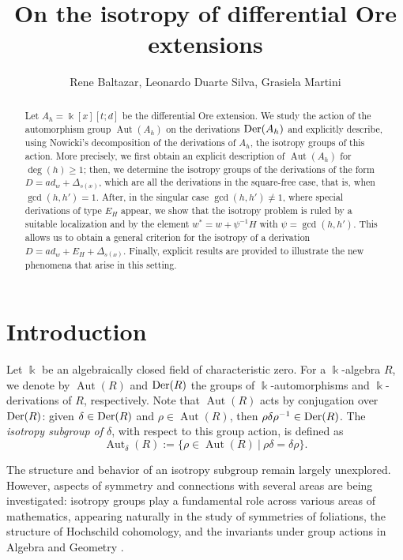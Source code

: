 \documentclass{article}
\title{On the isotropy of differential Ore extensions}
\author{Rene Baltazar, Leonardo Duarte Silva, Grasiela Martini}
\date{}
\numberwithin{equation}{section}\theoremstyle{plain}
\newcommand{\der}{{\rm Der}}
\DeclareMathOperator{\Aut}{Aut}
\begin{document}
\maketitle

\begin{abstract}
Let $A_h=\Bbbk[x][t;d]$ be the differential Ore extension. We study the action of the automorphism group $\Aut(A_h)$ on the derivations $\der(A_h)$ and explicitly describe, using Nowicki’s decomposition of the derivations of $A_h$, the isotropy groups of this action.
More precisely, we first obtain an explicit description of $\Aut(A_h)$ for $\deg(h)\geq 1$;
then, we determine the isotropy groups of the derivations of the form $D=ad_w+\Delta_{s(x)}$, which are all the derivations in the square-free case, that is, when $\gcd(h,h')=1$.
After, in the singular case $\gcd(h,h')\neq 1$, where special derivations of type $E_H$ appear, we show that the isotropy problem is ruled by a suitable localization and by the element $w^\ast=w+\psi^{-1}H$ with $\psi=\gcd(h,h')$.
This allows us to obtain a general criterion for the isotropy of a derivation $D=ad_w+E_H+\Delta_{s(x)}$.
Finally, explicit results are provided to illustrate the new phenomena that arise in this setting.

\end{abstract}


\maketitle


\section{Introduction}

Let $\Bbbk$ be an algebraically closed field of characteristic zero.
For a $\Bbbk$-algebra $R$, we denote by $\Aut(R)$ and $\der(R)$ the groups of $\Bbbk$-automorphisms and $\Bbbk$-derivations of $R$, respectively.
Note that $\Aut(R)$ acts by conjugation over $\der(R)$: given $\delta \in \der(R)$ and $\rho \in \Aut(R)$, then $\rho \delta \rho^{-1} \in \der(R)$.
The \emph{isotropy subgroup of $\delta$}, with respect to this group action, is defined
as
$$\Aut_\delta(R):=\{ \rho \in \Aut(R) \ \vert \ \rho \delta = \delta\rho \}. $$

The structure and behavior of an isotropy subgroup remain largely unexplored.
However, aspects of symmetry and connections with several areas are being investigated: isotropy groups play a fundamental role across various areas of mathematics, appearing naturally in the study of symmetries of foliations, the structure of Hochschild cohomology, and the invariants under group actions in Algebra and Geometry \cite{PanBalta, PanMendes}. 
\end{document}

